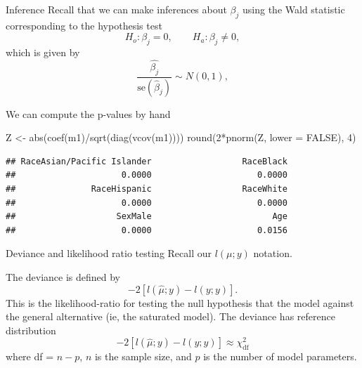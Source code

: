 \documentclass[
  ignorenonframetext,
]{beamer}
\newenvironment{Shaded}{\begin{snugshade}}{\end{snugshade}}
\newcommand{\AttributeTok}[1]{\textcolor[rgb]{0.77,0.63,0.00}{#1}}
\newcommand{\ConstantTok}[1]{\textcolor[rgb]{0.00,0.00,0.00}{#1}}
\newcommand{\DecValTok}[1]{\textcolor[rgb]{0.00,0.00,0.81}{#1}}
\newcommand{\FunctionTok}[1]{\textcolor[rgb]{0.00,0.00,0.00}{#1}}
\newcommand{\NormalTok}[1]{#1}
\newcommand{\OtherTok}[1]{\textcolor[rgb]{0.56,0.35,0.01}{#1}}
\newcommand{\SpecialCharTok}[1]{\textcolor[rgb]{0.00,0.00,0.00}{#1}}
\begin{document}
\begin{frame}[fragile]{Inference}
\protect\hypertarget{inference}{}
Recall that we can make inferences about \(\beta_j\) using the Wald
statistic corresponding to the hypothesis test \[
  H_o: \beta_j = 0, \qquad H_a:\beta_j \neq 0,
\] which is given by \[
  \frac{\hat{\beta_j}}{\text{se}(\hat\beta_j)} \sim N(0,1),
\]

We can compute the p-values by hand

\tiny

\begin{Shaded}
\begin{Highlighting}[]
\NormalTok{Z }\OtherTok{\textless{}{-}} \FunctionTok{abs}\NormalTok{(}\FunctionTok{coef}\NormalTok{(m1)}\SpecialCharTok{/}\FunctionTok{sqrt}\NormalTok{(}\FunctionTok{diag}\NormalTok{(}\FunctionTok{vcov}\NormalTok{(m1))))}
\FunctionTok{round}\NormalTok{(}\DecValTok{2}\SpecialCharTok{*}\FunctionTok{pnorm}\NormalTok{(Z, }\AttributeTok{lower =} \ConstantTok{FALSE}\NormalTok{), }\DecValTok{4}\NormalTok{)}
\end{Highlighting}
\end{Shaded}

\begin{verbatim}
## RaceAsian/Pacific Islander                  RaceBlack 
##                     0.0000                     0.0000 
##               RaceHispanic                  RaceWhite 
##                     0.0000                     0.0000 
##                    SexMale                        Age 
##                     0.0000                     0.0156
\end{verbatim}
\end{frame}

\begin{frame}{Deviance and likelihood ratio testing}
\protect\hypertarget{deviance-and-likelihood-ratio-testing}{}
Recall our \(l(\mu;y)\) notation.

\vspace{12pt}

The deviance is defined by \[
 -2\left[l(\hat\mu;y) - l(y;y)\right].
\] This is the likelihood-ratio for testing the null hypothesis that the
model against the general alternative (ie, the saturated model). The
deviance has reference distribution \[
  -2\left[l(\hat\mu;y) - l(y;y)\right] \approx \chi^2_{\text{df}}
\] where df = \(n - p\), \(n\) is the sample size, and \(p\) is the
number of model parameters.
\end{frame}
\end{document}
